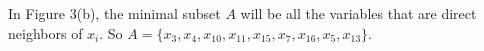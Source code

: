 \documentclass[11pt]{article}
\begin{document}
In Figure 3(b), the minimal subset $A$ will be all the variables that are direct neighbors of $x_i$. So $A = \{x_3, x_4, x_{10}, x_{11}, x_{15}, x_7, x_{16}, x_5, x_{13}\}$.

%
\end{document}
